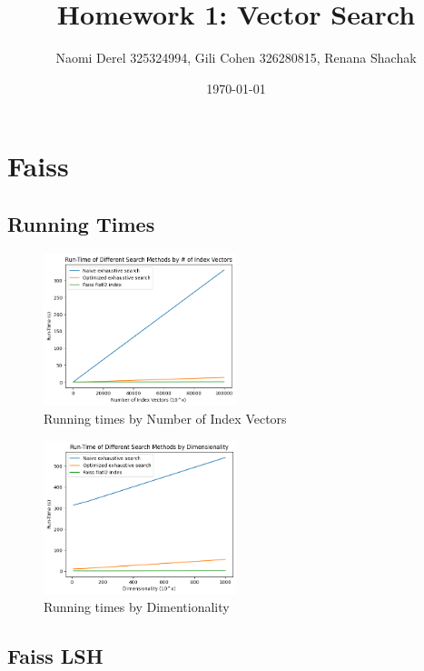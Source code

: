 \documentclass[12pt]{article}
\begin{document}
\title{Homework 1: Vector Search}
\author{Naomi Derel 325324994, Gili Cohen 326280815, Renana Shachak}
\date{\today}
\maketitle


\section{Faiss}

\subsection{Running Times}

\begin{figure}[h]
    \centering
    \includegraphics[width=0.5\textwidth]{images/1_1_1.png}
    \caption{Running times by Number of Index Vectors}
\end{figure}

\begin{figure}[h]
    \centering
    \includegraphics[width=0.5\textwidth]{images/1_1_2.png}
    \caption{Running times by Dimentionality}
\end{figure}

\subsection{Faiss LSH}



\end{document}
